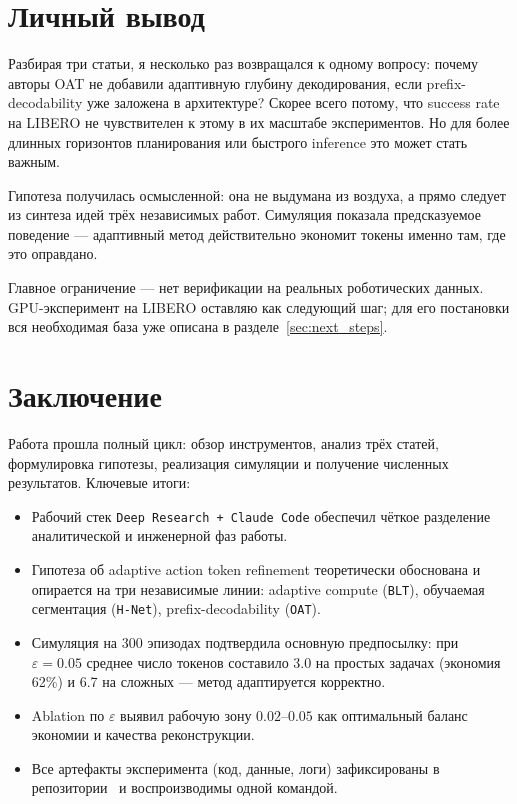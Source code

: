 \documentclass[12pt,a4paper]{article}
\begin{document}
\section{Личный вывод}

Разбирая три статьи, я несколько раз возвращался к одному вопросу: почему
авторы OAT не добавили адаптивную глубину декодирования, если prefix-decodability
уже заложена в архитектуре? Скорее всего потому, что success rate на LIBERO не
чувствителен к этому в их масштабе экспериментов. Но для более длинных горизонтов
планирования или быстрого inference это может стать важным.

Гипотеза получилась осмысленной: она не выдумана из воздуха, а прямо следует
из синтеза идей трёх независимых работ. Симуляция показала предсказуемое поведение
--- адаптивный метод действительно экономит токены именно там, где это оправдано.

Главное ограничение --- нет верификации на реальных роботических данных.
GPU-эксперимент на LIBERO оставляю как следующий шаг; для его постановки
вся необходимая база уже описана в разделе~\ref{sec:next_steps}.

\section{Заключение}

Работа прошла полный цикл: обзор инструментов, анализ трёх статей, формулировка
гипотезы, реализация симуляции и получение численных результатов. Ключевые итоги:

\begin{itemize}[leftmargin=1.4cm]
    \item Рабочий стек \texttt{Deep~Research\,+\,Claude Code} обеспечил чёткое
          разделение аналитической и инженерной фаз работы.
    \item Гипотеза об adaptive action token refinement теоретически обоснована и
          опирается на три независимые линии: adaptive compute (\texttt{BLT}),
          обучаемая сегментация (\texttt{H-Net}), prefix-decodability (\texttt{OAT}).
    \item Симуляция на 300 эпизодах подтвердила основную предпосылку:
          при $\varepsilon{=}0.05$ среднее число токенов составило 3.0 на простых
          задачах (экономия 62\%) и 6.7 на сложных --- метод адаптируется корректно.
    \item Ablation по $\varepsilon$ выявил рабочую зону $0.02$--$0.05$ как
          оптимальный баланс экономии и качества реконструкции.
    \item Все артефакты эксперимента (код, данные, логи) зафиксированы в
          репозитории~\cite{repo} и воспроизводимы одной командой.
\end{itemize}
\end{document}
